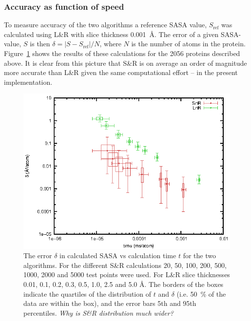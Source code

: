 \documentclass[a4paper,11pt]{article}
\begin{document}
\subsubsection{Accuracy as function of speed}\label{sec:accuracy}

To measure accuracy of the two algorithms a reference SASA value,
$S_\text{ref}$ was calculated using L\&R with slice thickness
0.001~Å. The error of a given SASA-value, $S$ is then $\delta = \lvert
S - S_\text{ref} \rvert / N$, where $N$ is the number of atoms in the
protein. Figure~\ref{fig:precision} shows the results of these
calculations for the 2056 proteins described above.  It is clear from
this picture that S\&R is on average an order of magnitude more
accurate than L\&R given the same computational effort -- in the
present implementation.

\begin{figure}
  \begin{center}
  \includegraphics{../analysis/plots/precision}
  \caption{The error $\delta$ in calculated SASA vs calculation time
    $t$ for the two algorithms. For the different S\&R calculations
    20, 50, 100, 200, 500, 1000, 2000 and 5000 test points were
    used. For L\&R slice thicknesses 0.01, 0.1, 0.2, 0.3, 0.5, 1.0,
    2.5 and 5.0 Å. The borders of the boxes indicate the quartiles of
    the distribution of $t$ and $\delta$ (i.e. 50~\% of the data are
    within the box), and the error bars 5th and 95th percentiles.
    \emph{Why is S\&R distribution much wider?}
    \label{fig:precision}}
  \end{center}
\end{figure}
\end{document}
